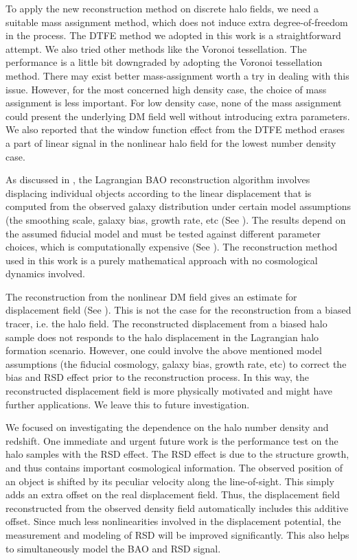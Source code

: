 \documentclass[iop]{emulateapj}
\begin{document}
{To apply the new reconstruction method on discrete halo fields,
we need a suitable mass assignment method, which does not induce extra degree-of-freedom in the process.
The DTFE method we adopted in this work is a straightforward attempt.
We also tried other methods like the Voronoi tessellation.
The performance is a little bit downgraded by adopting the Voronoi tessellation method.
There may exist better mass-assignment worth a try in dealing with this issue.
However, for the most concerned high density case, the choice of mass assignment is less important.
For low density case, none of the mass assignment could present the underlying DM field well without introducing extra parameters.
We also reported that the window function effect from the DTFE method erases a part of linear signal in the nonlinear halo field for the lowest number density case.


As discussed in \cite{zhuhm16c},
the Lagrangian BAO reconstruction algorithm involves displacing individual objects according to the linear displacement that is computed from the observed galaxy distribution under certain model assumptions (the smoothing scale, galaxy bias, growth rate, etc (See \cite{Eisenstein07}). The results depend on the assumed fiducial model and must be tested against different parameter choices, which is computationally expensive (See \cite{Padmanabhan12}). The reconstruction method used in this work is a purely mathematical approach with no cosmological dynamics involved. 

The reconstruction from the nonlinear DM field gives an estimate for displacement field (See \cite{zhuhm16c}).
This is not the case for the reconstruction from a biased tracer, i.e. the halo field.
The reconstructed displacement from a biased halo sample does not responds to the halo displacement in the Lagrangian halo formation scenario.
However, one could involve the above mentioned model assumptions (the fiducial cosmology, galaxy bias, growth rate, etc) to correct the bias and RSD effect prior to the reconstruction process.
In this way, the reconstructed displacement field is more physically motivated and might have further applications.
We leave this to future investigation.

We focused on investigating the dependence on the halo number density and redshift.
One immediate and urgent future work is the performance test on the halo samples with the RSD effect.
The RSD effect is due to the structure growth, and thus contains important cosmological information.
The observed position of an object is shifted by its peculiar velocity along the line-of-sight.
This simply adds an extra offset on the real displacement field. 
Thus, the displacement field reconstructed from the observed density field automatically includes this additive offset. 
Since much less nonlinearities involved in the displacement potential, the measurement and modeling of RSD will be improved significantly.
This also helps to simultaneously model the BAO and RSD signal.

}
\end{document}
